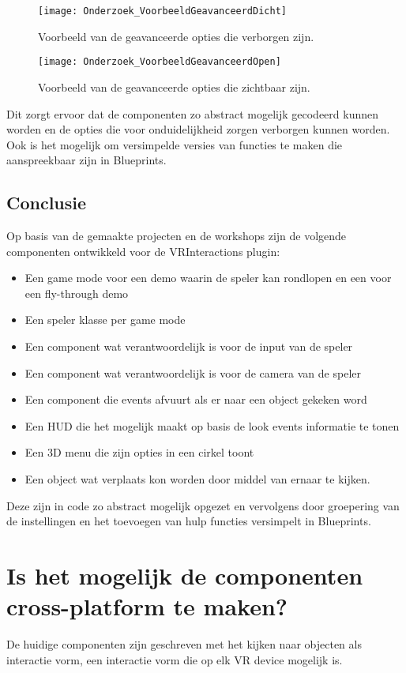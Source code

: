 \begin{figure}[H]
  \centering
    \texttt{[image: Onderzoek\_VoorbeeldGeavanceerdDicht]}
    \caption{Voorbeeld van de geavanceerde opties die verborgen zijn.}
\end{figure}

\begin{figure}[H]
  \centering
    \texttt{[image: Onderzoek\_VoorbeeldGeavanceerdOpen]}
    \caption{Voorbeeld van de geavanceerde opties die zichtbaar zijn.}
\end{figure}

Dit zorgt ervoor dat de componenten zo abstract mogelijk gecodeerd kunnen worden en de opties die voor onduidelijkheid zorgen verborgen kunnen worden. Ook is het mogelijk om versimpelde versies van functies te maken die aanspreekbaar zijn in Blueprints.

\subsection{Conclusie}
Op basis van de gemaakte projecten en de workshops zijn de volgende componenten ontwikkeld voor de VRInteractions plugin:

\begin{itemize}
	\item Een game mode voor een demo waarin de speler kan rondlopen en een voor een fly-through demo
	\item Een speler klasse per game mode
	\item Een component wat verantwoordelijk is voor de input van de speler
	\item Een component wat verantwoordelijk is voor de camera van de speler
	\item Een component die events afvuurt als er naar een object gekeken word
	\item Een HUD die het mogelijk maakt op basis de look events informatie te tonen
	\item Een 3D menu die zijn opties in een cirkel toont
	\item Een object wat verplaats kon worden door middel van ernaar te kijken.
\end{itemize}

Deze zijn in code zo abstract mogelijk opgezet en vervolgens door groepering van de instellingen en het toevoegen van hulp functies versimpelt in Blueprints.

\section{Is het mogelijk de componenten cross-platform te maken?}
De huidige componenten zijn geschreven met het kijken naar objecten als interactie vorm, een interactie vorm die op elk VR device mogelijk is. 


